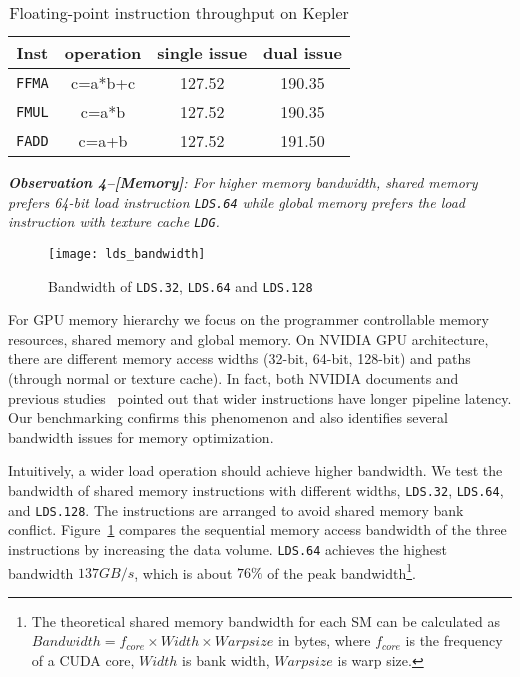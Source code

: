 \begin{table}[htbp]
\caption{Floating-point instruction throughput on Kepler}
\centering
\scalebox{0.9} {
\begin{tabular}{|c|c|c|c|}
\hline
Inst &operation&single issue&dual issue\\
\hline
{\tt FFMA} &c=a*b+c&127.52&190.35 \\
\hline
{\tt FMUL} &c=a*b&127.52&190.35 \\
\hline
{\tt FADD} &c=a+b&127.52&191.50\\
\hline
\end{tabular}
}
\label{tab:ffma}
\end{table}


{\em {\bf Observation 4--[Memory]}: For higher memory bandwidth, shared memory prefers 64-bit load
instruction {\tt LDS.64} while global memory prefers the load instruction with texture cache {\tt LDG}.}

\begin{figure}[htbp]
\begin{center}
\texttt{[image: lds\_bandwidth]}
    \caption{ Bandwidth of {\tt LDS.32}, {\tt LDS.64} and {\tt LDS.128}}
\label{fig:lds_bw}
\end{center}
\end{figure}

For GPU memory hierarchy we focus on the programmer controllable memory resources, shared memory and global memory.
On NVIDIA GPU architecture, there are different memory access widths (32-bit, 64-bit, 128-bit) and paths (through normal or texture cache).
In fact, both NVIDIA documents and previous studies~\cite{tan} pointed out that wider
instructions have longer pipeline latency.
Our benchmarking confirms this phenomenon and also identifies several bandwidth issues for memory optimization.

Intuitively, a wider load operation should achieve higher bandwidth.
We test the bandwidth of shared memory instructions with different widths, {\tt LDS.32}, {\tt LDS.64},
and {\tt LDS.128}.
The instructions are arranged to avoid shared memory bank conflict.
Figure~\ref{fig:lds_bw} compares the sequential memory access bandwidth of the three instructions by increasing the data volume.
{\tt LDS.64} achieves the highest bandwidth $137GB/s$, which is about $76\%$ of the peak bandwidth\footnote{The
theoretical shared memory bandwidth for each SM can be calculated as $Bandwidth = f_{core} \times Width \times Warpsize$ in
bytes, where $f_{core}$ is the frequency of a CUDA core, $Width$ is bank width, $Warpsize$ is warp size.}.

